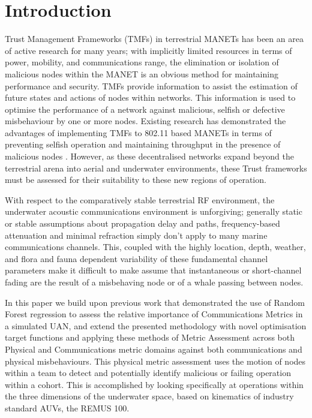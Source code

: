 \documentclass[conference]{IEEEtran}
\begin{document}
\section{Introduction}
\IEEEpubidadjcol

Trust Management Frameworks (TMFs) in terrestrial MANETs has been an area of active research for many years; with implicitly limited resources in terms of power, mobility, and communications range, the elimination or isolation of malicious nodes within the MANET is an obvious method for maintaining performance and security. 
TMFs provide information to assist the estimation of future states and actions of nodes within networks. 
This information is used to optimise the performance of a network against malicious, selfish or defective misbehaviour by one or more nodes. 
Existing research has demonstrated the advantages of implementing TMFs to 802.11 based MANETs in terms of preventing selfish operation and maintaining throughput in the presence of malicious nodes \cite{Li2007,Buchegger2002}.
However, as these decentralised networks expand beyond the terrestrial arena into aerial and underwater environments, these Trust frameworks must be assessed for their suitability to these new regions of operation.

With respect to the comparatively stable terrestrial RF environment, the underwater acoustic communications environment is unforgiving; generally static or stable assumptions about propagation delay and paths, frequency-based attenuation and minimal refraction simply don't apply to many marine communications channels.
This, coupled with the highly location, depth, weather, and flora and fauna dependent variability of these fundamental channel parameters make it difficult to make assume that instantaneous or short-channel fading are the result of a misbehaving node or of a whale passing between nodes.

In this paper we build upon previous work \cite{Bolster2015} that demonstrated the use of  Random Forest regression \cite{Breiman2001} to assess the relative importance of Communications Metrics in a simulated UAN, and extend the presented methodology with novel optimisation target functions and applying these methods of Metric Assessment across both Physical and Communications metric domains against both communications and physical misbehaviours.
This physical metric assessment uses the motion of nodes within a team to detect and potentially identify malicious or failing operation within a cohort.
This is accomplished by looking specifically at operations within the three dimensions of the underwater space, based on kinematics of industry standard AUVs, the REMUS 100.
\end{document}
